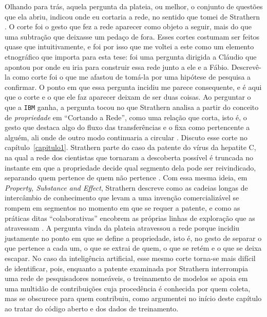 Olhando para trás, aquela pergunta da plateia, ou melhor, o conjunto de questões que ela abriu, indicou onde eu cortaria a rede, no sentido que tomei de Strathern \parencite{strathern2011cortando}. O corte foi o gesto que fez a rede aparecer como objeto a seguir, mais do que uma subtração que deixasse um pedaço de fora. Esses cortes costumam ser feitos quase que intuitivamente, e foi por isso que me voltei a este como um elemento etnográfico que importa para esta tese: foi uma pergunta dirigida a Cláudio que apontou por onde eu iria para construir essa rede junto a ele e a Fábio. Descrevê-la como corte foi o que me afastou de tomá-la por uma hipótese de pesquisa a confirmar. O ponto em que essa pergunta incidiu me parece consequente, e é aqui que o corte e o que ele faz aparecer deixam de ser duas coisas. Ao perguntar o que a \texttt{IBM} ganha, a pergunta tocou no que Strathern analisa a partir do conceito de \emph{propriedade} em \enquote{Cortando a Rede}, como uma relação que corta, isto é, o gesto que destaca algo do fluxo das transferências e o fixa como pertencente a alguém, ali onde de outro modo continuaria a circular \parencite[p. 29]{strathern2011cortando}. Discuto esse corte no capítulo~\ref{capitulo1}. Strathern parte do caso da patente do vírus da hepatite C, na qual a rede dos cientistas que tornaram a descoberta possível é truncada no instante em que a propriedade decide qual segmento dela pode ser reivindicado, separando quem pertence de quem não pertence \parencite[pp. 27--29]{strathern2011cortando}. Com essa mesma ideia, em \textit{Property, Substance and Effect}, Strathern descreve como as cadeias longas de intercâmbio de conhecimento que levam a uma invenção comercializável se rompem em segmentos no momento em que se requer a patente, e como as práticas ditas \enquote{colaborativas} encobrem as próprias linhas de exploração que as atravessam \parencite[p.~169]{strathern2000pse}. A pergunta vinda da plateia atravessou a rede porque incidiu justamente no ponto em que se define a propriedade, isto é, no gesto de separar o que pertence a cada um, o que se extrai de quem, o que se retém e o que se deixa escapar. No caso da inteligência artificial, esse mesmo corte torna-se mais difícil de identificar, pois, enquanto a patente examinada por Strathern interrompia uma rede de pesquisadores nomeáveis, o treinamento de modelos se apoia em uma multidão de contribuições cuja procedência é conhecida por quem coleta, mas se obscurece para quem contribuiu, como argumentei no início deste capítulo ao tratar do código aberto e dos dados de treinamento.

